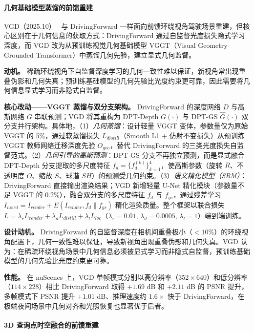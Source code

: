 \paragraph{几何基础模型蒸馏的前馈重建}

VGD（2025.10）~\cite{2510_19578} 与 DrivingForward 一样面向前馈环绕视角驾驶场景重建，但核心区别在于几何信息的获取方式：DrivingForward 通过自监督光度损失隐式学习深度，而 VGD 改为从预训练视觉几何基础模型 VGGT（Visual Geometry Grounded Transformer）中蒸馏几何先验，建立显式几何监督。

\textbf{动机。} 稀疏环绕视角下自监督深度学习的几何一致性难以保证，新视角常出现重叠伪影和几何失真；预训练基础模型的几何先验比光度约束更可靠，因此需要将几何信息显式学习而非隐式自监督。

\textbf{核心改动——VGGT 蒸馏与双分支架构。} DrivingForward 的深度网络 $D$ 与高斯网络 $G$ 串联预测；VGD 将其重构为 DPT-Depth $G(\cdot)$ 与 DPT-GS $\hat{G}(\cdot)$ 双分支并行架构。具体地，（1）\textit{几何蒸馏}：设计轻量 VGGT 变体，参数量仅为原始 VGGT 的 5\%，通过软蒸馏损失 $L_{distill}$（Smooth L1 + 仿射不变损失）从预训练 VGGT 教师网络迁移深度先验 $O_{geo}$，替代 DrivingForward 的三类光度损失自监督范式。（2）\textit{几何引导的高斯预测}：DPT-GS 分支不再独立预测，而是显式融合 DPT-Depth 分支提取的多尺度特征 $f_d = \{f_d^{(k)}\}_{k=1}^4$，使高斯参数（旋转 $R$、不透明度 $O$、缩放 $S$、球谐 $SH$）的预测受几何约束。（3）\textit{语义精化模型（SRM）}：DrivingForward 直接输出渲染结果；VGD 新增轻量 U-Net 精化模块（参数量不足 VGGT 的 0.2\%），融合双分支的多尺度特征 $f_d$ 与 $f_{gs}$，通过残差学习 $I_{novel} = I_{render} + E(I_{render}, f_d \| f_{gs})$ 精化渲染质量。整个框架以联合损失 $L = \lambda_r L_{render} + \lambda_d L_{distill} + \lambda_l L_{loc}$（$\lambda_r{=}0.01$, $\lambda_d{=}0.0005$, $\lambda_l{=}1$）端到端训练。

\textbf{设计动机。} DrivingForward 的自监督深度在相机间重叠极小（$<10\%$）的环绕视角配置下，几何一致性难以保证，导致新视角出现重叠伪影和几何失真。VGD 认为：在稀疏环绕视角场景中几何信息必须被显式学习而非隐式自监督，预训练基础模型的几何先验比光度约束更可靠。

\textbf{性能。} 在 nuScenes 上，VGD 单帧模式分别以高分辨率（$352{\times}640$）和低分辨率（$114{\times}228$）相比 DrivingForward 取得 $+1.69$ dB 和 $+2.11$ dB 的 PSNR 提升，多帧模式下 PSNR 提升 $+1.01$ dB、推理速度约 $1.6\times$ 快于 DrivingForward，在极端夜间场景中几何对齐和光照恢复也显著优于后者。

\paragraph{3D 查询点时空融合的前馈重建}

